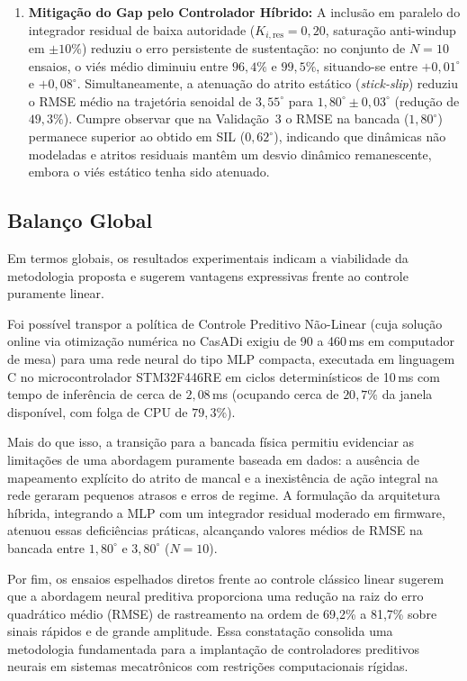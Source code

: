 \begin{enumerate}
    \item \textbf{Mitigação do Gap pelo Controlador Híbrido:} A inclusão em paralelo do integrador residual de baixa autoridade ($K_{i,\text{res}} = 0{,}20$, saturação anti-windup em $\pm 10\%$) reduziu o erro persistente de sustentação: no conjunto de $N=10$ ensaios, o viés médio diminuiu entre $96{,}4\%$ e $99{,}5\%$, situando-se entre $+0{,}01^\circ$ e $+0{,}08^\circ$. Simultaneamente, a atenuação do atrito estático (\textit{stick-slip}) reduziu o RMSE médio na trajetória senoidal de $3{,}55^\circ$ para $1{,}80^\circ \pm 0{,}03^\circ$ (redução de $49{,}3\%$). Cumpre observar que na Validação~3 o RMSE na bancada ($1{,}80^\circ$) permanece superior ao obtido em SIL ($0{,}62^\circ$), indicando que dinâmicas não modeladas e atritos residuais mantêm um desvio dinâmico remanescente, embora o viés estático tenha sido atenuado.
\end{enumerate}

\subsection{Balanço Global}

Em termos globais, os resultados experimentais indicam a viabilidade da metodologia proposta e sugerem vantagens expressivas frente ao controle puramente linear.

Foi possível transpor a política de Controle Preditivo Não-Linear (cuja solução online via otimização numérica no CasADi exigiu de 90 a 460\,ms em computador de mesa) para uma rede neural do tipo MLP compacta, executada em linguagem C no microcontrolador STM32F446RE em ciclos determinísticos de 10\,ms com tempo de inferência de cerca de $2{,}08$\,ms (ocupando cerca de $20{,}7\%$ da janela disponível, com folga de CPU de $79{,}3\%$).

Mais do que isso, a transição para a bancada física permitiu evidenciar as limitações de uma abordagem puramente baseada em dados: a ausência de mapeamento explícito do atrito de mancal e a inexistência de ação integral na rede geraram pequenos atrasos e erros de regime. A formulação da arquitetura híbrida, integrando a MLP com um integrador residual moderado em firmware, atenuou essas deficiências práticas, alcançando valores médios de RMSE na bancada entre $1{,}80^\circ$ e $3{,}80^\circ$ ($N = 10$).

Por fim, os ensaios espelhados diretos frente ao controle clássico linear sugerem que a abordagem neural preditiva proporciona uma redução na raiz do erro quadrático médio (RMSE) de rastreamento na ordem de 69,2\% a 81,7\% sobre sinais rápidos e de grande amplitude. Essa constatação consolida uma metodologia fundamentada para a implantação de controladores preditivos neurais em sistemas mecatrônicos com restrições computacionais rígidas.
